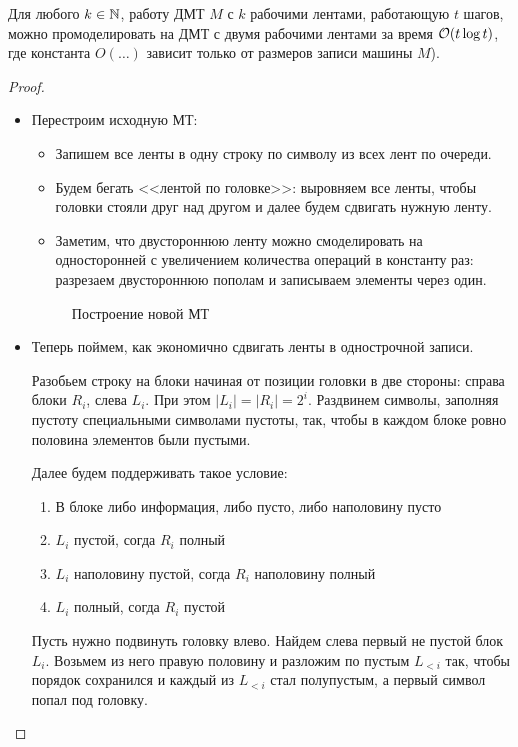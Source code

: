 \begin{thm}\label{th:two_bands}
	Для любого $ k \in \mathbb{N}$, работу ДМТ  $ M$ с $ k$ рабочими лентами, работающую $ t$ шагов, можно  промоделировать на  ДМТ с двумя рабочими лентами за время  $ \mathcal{O}(t \log t)$, 
	где константа $ O(\ldots ) $ зависит только от размеров записи машины $ M$).
\end{thm}
\begin{proof}
	\begin{itemize}
		\item
			Перестроим исходную МТ:
			\begin{itemize}
				\item Запишем все ленты в одну строку  по символу из всех лент по очереди.
				\item  Будем бегать <<лентой по головке>>: выровняем все ленты, чтобы головки стояли друг над  другом и далее будем сдвигать нужную ленту.
				\item Заметим, что двустороннюю ленту можно смоделировать на односторонней с увеличением количества операций в константу раз: разрезаем двустороннюю пополам и записываем элементы через один.
			\end{itemize}
		\begin{figure}[ht]
			\centering
			\caption{Построение новой МТ}
			\label{fig:two-bands}
		\end{figure}
		\item 
			Теперь поймем, как экономично сдвигать ленты в однострочной записи.

			Разобьем строку на блоки начиная от позиции головки в две стороны: справа блоки $ R_i$, слева $ L_i$. При этом $ \lvert L_i \rvert = \lvert R_i \rvert  = 2^{i}$. Раздвинем символы, заполняя пустоту специальными символами пустоты, так, чтобы в каждом блоке ровно половина элементов были пустыми.

			Далее будем поддерживать такое условие: 
			\begin{enumerate}[noitemsep]
				\item В блоке либо информация, либо пусто, либо наполовину пусто
				\item $ L_i$ пустой, согда  $ R_i$ полный
				\item  $ L_i$ наполовину пустой, согда $ R_i$ наполовину полный 
				\item $ L_i$ полный, согда $ R_i$ пустой
			\end{enumerate} 

			Пусть нужно подвинуть головку влево. Найдем слева первый не пустой блок $ L_i$. Возьмем из него правую половину и разложим по пустым $ L_{<i}$ так, чтобы порядок сохранился и каждый из $ L_{<i}$ стал полупустым, а первый символ попал под головку.
			

\end{itemize}
\end{proof}
